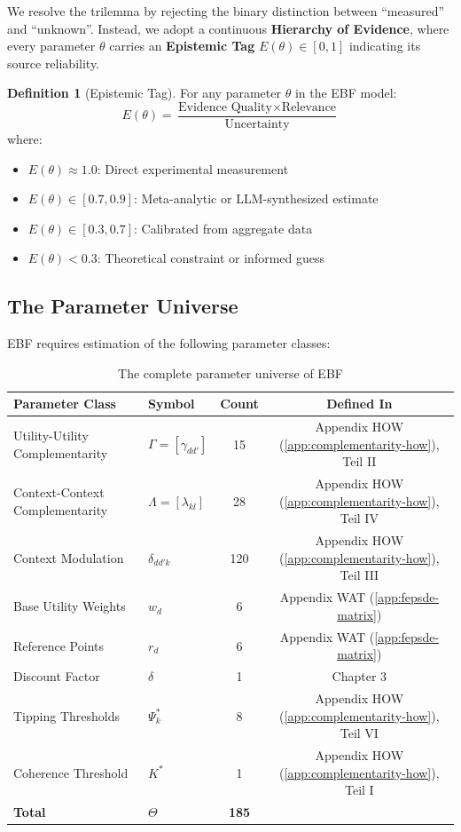 \documentclass[11pt,a4paper]{article}
\theoremstyle{definition}
\newtheorem{definition}{Definition}[section]
\begin{document}
We resolve the trilemma by rejecting the binary distinction between ``measured'' 
and ``unknown''. Instead, we adopt a continuous \textbf{Hierarchy of Evidence}, 
where every parameter $\theta$ carries an \textbf{Epistemic Tag} $E(\theta) \in [0, 1]$ 
indicating its source reliability.

\begin{definition}[Epistemic Tag]
\label{def:epistemic-tag}
For any parameter $\theta$ in the EBF model:
\begin{equation}
E(\theta) = \frac{\text{Evidence Quality} \times \text{Relevance}}{\text{Uncertainty}}
\end{equation}
where:
\begin{itemize}
    \item $E(\theta) \approx 1.0$: Direct experimental measurement
    \item $E(\theta) \in [0.7, 0.9]$: Meta-analytic or LLM-synthesized estimate
    \item $E(\theta) \in [0.3, 0.7]$: Calibrated from aggregate data
    \item $E(\theta) < 0.3$: Theoretical constraint or informed guess
\end{itemize}
\end{definition}

\subsection{The Parameter Universe}

EBF requires estimation of the following parameter classes:

\begin{table}[h]
\centering
\begin{tabular}{llcc}
\toprule
\textbf{Parameter Class} & \textbf{Symbol} & \textbf{Count} & \textbf{Defined In} \\
\midrule
Utility-Utility Complementarity & $\Gamma = [\gamma_{dd'}]$ & 15 & Appendix HOW (\ref{app:complementarity-how}), Teil II \\
Context-Context Complementarity & $\Lambda = [\lambda_{kl}]$ & 28 & Appendix HOW (\ref{app:complementarity-how}), Teil IV \\
Context Modulation & $\delta_{dd'k}$ & 120 & Appendix HOW (\ref{app:complementarity-how}), Teil III \\
Base Utility Weights & $w_d$ & 6 & Appendix WAT (\ref{app:fepsde-matrix}) \\
Reference Points & $r_d$ & 6 & Appendix WAT (\ref{app:fepsde-matrix}) \\
Discount Factor & $\delta$ & 1 & Chapter 3 \\
Tipping Thresholds & $\Psi^*_k$ & 8 & Appendix HOW (\ref{app:complementarity-how}), Teil VI \\
Coherence Threshold & $K^*$ & 1 & Appendix HOW (\ref{app:complementarity-how}), Teil I \\
\midrule
\textbf{Total} & $\Theta$ & \textbf{185} & \\
\bottomrule
\end{tabular}
\caption{The complete parameter universe of EBF}
\label{tab:parameter-universe}
\end{table}
\end{document}
